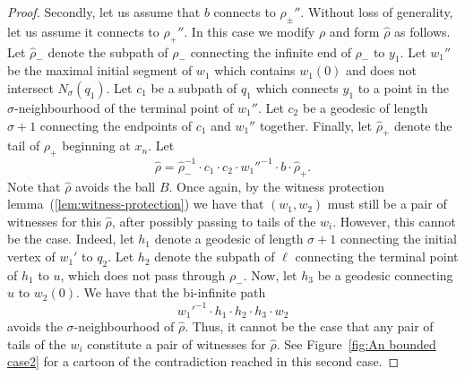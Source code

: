 \documentclass[11pt,a4paper]{amsart}
\theoremstyle{definition}
\begin{document}
\begin{proof}
        Secondly, let us assume that $b$ connects to $\rho_\pm''$. Without loss of generality, let us assume it connects to $\rho_+''$. In this case we modify $\rho$ and form $\hat \rho$ as follows. 
        Let $\hat \rho_-$ denote the subpath of $\rho_-$ connecting the infinite end of $\rho_-$ to $y_1$. 
        Let $w_1''$ be the maximal initial segment of $w_1$ which contains $w_1(0)$ and does not intersect $N_\sigma(q_1)$. Let $c_1$ be a subpath of $q_1$ which connects $y_1$ to a point in the $\sigma$-neighbourhood of the terminal point of $w_1''$. 
        Let $c_2$ be a geodesic of length $\sigma+1$ connecting the endpoints of $c_1$ and $w_1''$ together.  Finally, let $\hat \rho_+$ denote the tail of $\rho_+$ beginning at $x_n$. 
        Let 
        $$
        \hat \rho = \hat \rho_-^{-1} \cdot c_1 \cdot c_2 \cdot w_1''^{-1} \cdot b \cdot \hat \rho_+.
        $$
        Note that $\hat \rho$ avoids the ball $B$. 
        Once again, by the witness protection lemma~(\ref{lem:witness-protection}) we have that $(w_1, w_2)$ must still be a pair of witnesses for this $\hat \rho$, after possibly passing to tails of the $w_i$. However, this cannot be the case. Indeed, let $h_1$ denote a geodesic of length $\sigma+1$ connecting the initial vertex of $w_1'$ to $q_2$. Let $h_2$ denote the subpath of $\ell$ connecting the terminal point of $h_1$ to $u$, which does not pass through $\rho_-$. Now, let $h_3$ be a geodesic connecting $u$ to $w_2(0)$. We have that the bi-infinite path
        $$
        w_1'^{-1} \cdot h_1 \cdot h_2 \cdot h_3 \cdot w_2
        $$
        avoids the $\sigma$-neighbourhood of $\hat \rho$. Thus, it cannot be the case that any pair of tails of the $w_i$ constitute a pair of witnesses for $\hat \rho$. See Figure~\ref{fig:An bounded case2} for a cartoon of the contradiction reached in this second case. 
    \end{proof}
\end{document}
